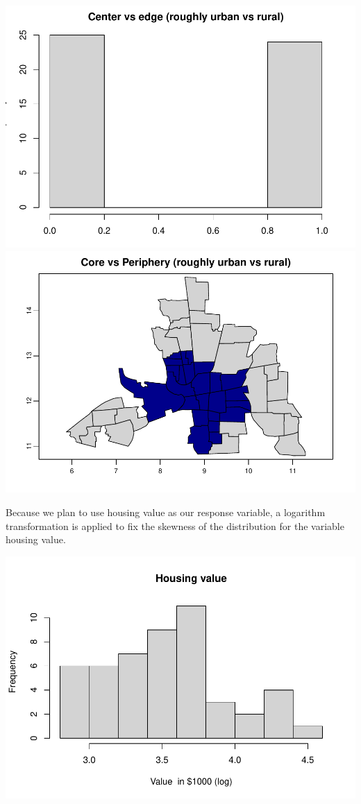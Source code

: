 \documentclass[
]{article}
\newenvironment{Shaded}{\begin{snugshade}}{\end{snugshade}}
\newcommand{\AttributeTok}[1]{\textcolor[rgb]{0.77,0.63,0.00}{#1}}
\newcommand{\CommentTok}[1]{\textcolor[rgb]{0.56,0.35,0.01}{\textit{#1}}}
\newcommand{\FunctionTok}[1]{\textcolor[rgb]{0.00,0.00,0.00}{#1}}
\newcommand{\NormalTok}[1]{#1}
\newcommand{\SpecialCharTok}[1]{\textcolor[rgb]{0.00,0.00,0.00}{#1}}
\newcommand{\StringTok}[1]{\textcolor[rgb]{0.31,0.60,0.02}{#1}}
\begin{document}
\includegraphics[width=0.5\linewidth]{midterm-project_files/figure-latex/unnamed-chunk-3-11}
\includegraphics[width=0.5\linewidth]{midterm-project_files/figure-latex/unnamed-chunk-3-12}

Because we plan to use housing value as our response variable, a
logarithm transformation is applied to fix the skewness of the
distribution for the variable housing value.

\begin{Shaded}
\end{Shaded}

\includegraphics{midterm-project_files/figure-latex/unnamed-chunk-4-1.pdf}
\end{document}
